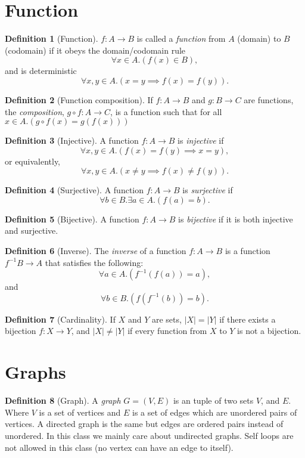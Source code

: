 \documentclass[12pt]{article}
\theoremstyle{definition}
\newtheorem{definition}{Definition}[section]
\begin{document}
\section{Function}
\begin{definition}[Function]
    $f: A \to B$ is called a \emph{function} from $A$ (domain) to $B$ (codomain) if it obeys the domain/codomain rule
    $$\forall x \in A.(f(x) \in B),$$
    and is deterministic
    $$
    \forall x, y \in A.(x = y \implies f(x) = f(y)).
    $$
\end{definition}
\begin{definition}[Function composition]
    If $f:A \to B$ and $g:B \to C$ are functions, the \emph{composition}, $g \circ f : A \to C$, is a function such that for all $x \in A.(g \circ f(x) = g(f(x)))$
\end{definition}
\begin{definition}[Injective]
    A function $f: A\to B$ is \emph{injective} if 
    $$\forall x,y \in A.(f(x) = f(y) \implies x = y),$$
    or equivalently, 
    $$\forall x,y \in A.(x \neq y \implies f(x) \neq f(y)).$$
\end{definition}
\begin{definition}[Surjective]
    A function $f: A\to B$ is \emph{surjective} if 
    $$\forall b \in B.\exists a \in A. (f(a) = b).$$
\end{definition}
\begin{definition}[Bijective]
    A function $f: A\to B$ is \emph{bijective} if it is both injective and surjective.
\end{definition}
\begin{definition}[Inverse]
    The \emph{inverse} of a function $f:A \to B$ is a function $f^{-1} B \to A$ that satisfies the following: 
    $$
    \forall a \in A.(f^{-1}(f(a)) = a),
    $$
    and 
    $$
    \forall b \in B.(f(f^{-1}(b)) = b).
    $$
\end{definition}

\begin{definition}[Cardinality]
    If $X$ and $Y$ are sets, $|X| = |Y|$ if there exists a bijection $f: X \to Y$, and $|X| \neq |Y|$ if every function from $X$ to $Y$ is not a bijection.
\end{definition}

\section{Graphs}

\begin{definition}[Graph]
    A \emph{graph} $G = (V, E)$ is an tuple of two sets $V$, and $E$. Where $V$ is a set of vertices and $E$ is a set of edges which are unordered pairs of vertices. A directed graph is the same but edges are ordered pairs instead of unordered. In this class we mainly care about undirected graphs. Self loops are not allowed in this class (no vertex can have an edge to itself).
\end{definition}
\end{document}
